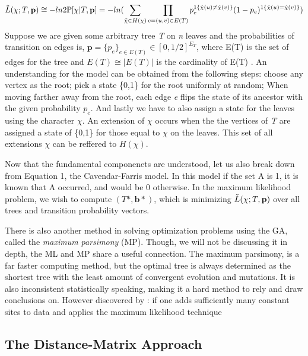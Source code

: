 \begin{equation}
\label{Cavendar-Farris}
\tilde{\mathnormal{L}}(\chi;\mathnormal{T},\textbf{p})\cong -ln2\mathbb{P}[\chi|\mathnormal{T}, \textbf{p}] = -ln(\sum \limits_{\tilde{\chi}\in H(\chi)} \prod\limits_{e=(u,v)\in E(T)} p_e^{1\{\hat{\chi}(u)\neq\hat{\chi}(v)\}} (1-p_e)^{1\{\hat{\chi}(u)=\hat{\chi}(v)\}}) 
\end{equation}
Suppose we are given some arbitrary tree \emph{T} on \emph{n} leaves and the probabilities of transition on edges is, $\textbf{p} = \{ p_e \}_{e \in E(T)} \in [0,1/2]^{E_T}$, where E(T) is the set of edges for the tree and $E(T) \cong |E(T)|$ is the cardinality of E(T) \cite{Roch}. An understanding for the model can be obtained from the following steps: choose any vertex as the root; pick a state \{0,1\} for the root uniformly at random; When moving farther away from the root, each edge \emph{e} flips the state of its ancestor with the given probability $p_e$. And lastly we have to also assign a state for the leaves using the character $\chi$. An extension of $\chi$ occurs when the the vertices of \emph{T} are assigned a state of \{0,1\} for those equal to $\chi$ on the leaves. This set of all extensions $\chi$ can be reffered to $H(\chi)$.

Now that the fundamental componenets are understood, let us also break down from Equation 1, the Cavendar-Farris model. In this model if the set {A} is 1, it is known that A occurred, and would be 0 otherwise. In the maximum likelihood problem, we wish to compute $(T*,\textbf{b}*)$, which is minimizing $\tilde{\mathnormal{L}}(\chi;T,\textbf{p})$ over all trees and transition probability vectors. 

There is also another method in solving optimization problems using the GA, called the \emph{maximum parsimony} (MP). Though, we will not be discussing it in depth, the ML and MP share a useful connection. The maximum parsimony, is a far faster computing method, but the optimal tree is always determined as the shortest tree with the least amount of convergent evolution and mutations. It is also inconsistent statistically speaking, making it a hard method to rely and draw conclusions on. However discovered by \cite{Tuffley}: if one adds sufficiently many constant sites to data and applies the maximum likelihood technique 

\subsection{The Distance-Matrix Approach}      


